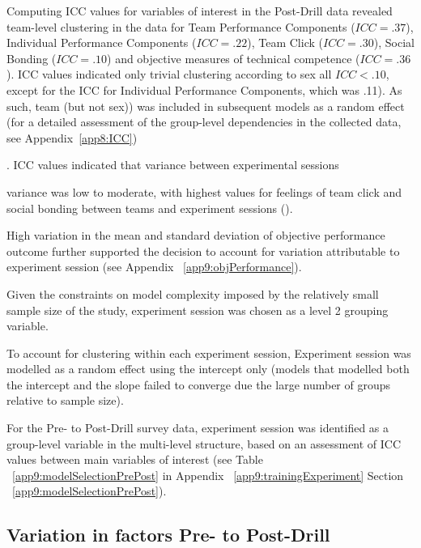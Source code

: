 
Computing ICC values for variables of interest in the Post-Drill data revealed team-level clustering in the data for Team Performance Components ($ICC = .37$), Individual Performance Components ($ICC = .22$), Team Click ($ICC = .30$), Social Bonding ($ICC = .10$) and objective measures of technical competence ($ICC = .36$).  ICC values indicated only trivial clustering according to sex all $ICC < .10$, except for the ICC for Individual Performance Components, which was .11).  As such, team (but not sex)) was included in subsequent models as a random effect (for a detailed assessment of the group-level dependencies in the collected data, see Appendix~\ref{app8:ICC})

.
 ICC values indicated that variance between experimental sessions


 variance was low to moderate, with highest values for feelings of team click and social bonding between teams and experiment sessions ().

 High variation in the mean and standard deviation of objective performance outcome further supported the decision to account for variation attributable to experiment session (see Appendix ~\ref{app9:objPerformance}).

 Given the constraints on model complexity imposed by the relatively small sample size of the study, experiment session was chosen as a level 2 grouping variable.

To account for clustering within each experiment session, Experiment session was modelled as a random effect using the intercept only (models that modelled both the intercept and the slope failed to converge due the large number of groups relative to sample size).






For the Pre- to Post-Drill survey data, experiment session was identified as a group-level variable in the multi-level structure, based on an assessment of ICC values between main variables of interest (see Table ~\ref{app9:modelSelectionPrePost} in Appendix ~\ref{app9:trainingExperiment} Section ~\ref{app9:modelSelectionPrePost}).



\subsection{Variation in factors Pre- to Post-Drill}

